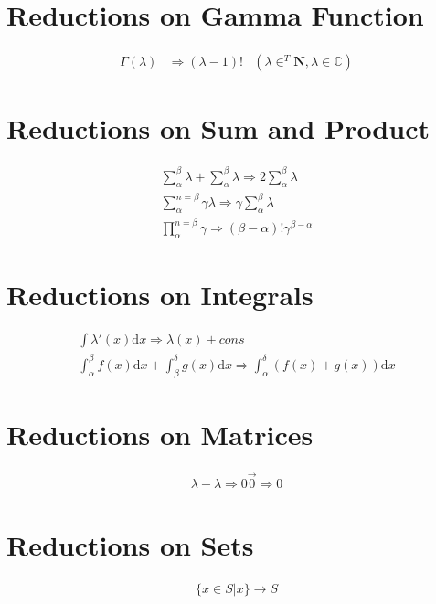 \documentclass[11pt,a4paper]{book}
\begin{document}
\section{Reductions on Gamma Function}

\begin{align}
\Gamma(\lambda) &\Rightarrow (\lambda - 1)! & \left(\lambda \in^T \mathbf{N}, \lambda \in \mathbb{C} \right)
\end{align}

\section{Reductions on Sum and Product}

\begin{eqnarray}
\sum_{\alpha}^{\beta} \lambda + \sum_{\alpha}^{\beta} \lambda \Rightarrow 2 \sum_{\alpha}^{\beta} \lambda \\
\sum_{\alpha}^{n = \beta} \gamma \lambda \Rightarrow \gamma \sum_{\alpha}^{\beta} \lambda \\
\prod_{\alpha}^{n = \beta} \gamma \Rightarrow \left( \beta - \alpha \right)! \gamma^{\beta - \alpha}
\end{eqnarray}

\section{Reductions on Integrals}

\begin{eqnarray}
\int \lambda'(x) \text{d}x \Rightarrow \lambda(x) + cons \\
\int_{\alpha}^{\beta} f(x) \text{d}x + \int_{\beta}^{\delta} g(x) \text{d}x \Rightarrow \int_{\alpha}^{\delta} \left( f(x) + g(x) \right) \text{d}x  
\end{eqnarray}

\section{Reductions on Matrices}

\begin{eqnarray}
\lambda - \lambda \Rightarrow 0
\vec{0} \Rightarrow 0
\end{eqnarray}

\section{Reductions on Sets}

\begin{eqnarray}
\lbrace x \in S | x \rbrace \rightarrow S
\end{eqnarray}
\end{document}
